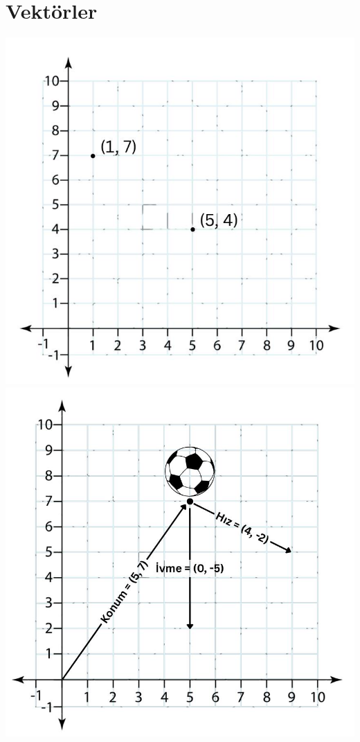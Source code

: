 \documentclass[12pt, a4paper]{article}
\begin{document}
\section*{Vektörler}
\includegraphics[width=1\linewidth]{vek-mesafe.png}
\newpage
\includegraphics[width=1\linewidth]{vek-konum-hiz-ivme.png}
\end{document}
